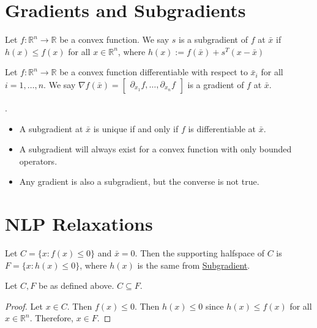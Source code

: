 \documentclass[a4paper]{report}
\begin{document}
	\section{Gradients and Subgradients}
	\begin{definition}[Subgradient]
		\label{subgradient} Let $f : \mathbb{R}^{n} \rightarrow \mathbb{R}$ be a convex
		function. We say $s$ is a subgradient of $f$ at $\bar x$ if $h(x) \leq f(x)$
		for all $x \in \mathbb{R}^{n}$, where $h(x) := f(\bar x) + s^{T} (x - \bar x)$
	\end{definition}
	\begin{definition}[Gradient]
		Let $f : \mathbb{R}^{n} \rightarrow \mathbb{R}$ be a convex function differentiable
		with respect to $\bar x_{i}$ for all $i = 1, \dots, n$. We say
		$\nabla f(\bar x) =
		\begin{bmatrix}
			\partial_{x_1}f, \dots, \partial_{x_n}f
		\end{bmatrix}$ is a gradient of $f$ at $\bar x$.
	\end{definition}

	\begin{proposition}
		\label{prop} . \\
		\begin{itemize}
			\item A subgradient at $\bar x$ is unique if and only if $f$ is differentiable
				at $\bar x$.

			\item A subgradient will always exist for a convex function with only bounded
				operators.

			\item Any gradient is also a subgradient, but the converse is not true.
		\end{itemize}
	\end{proposition}

	\section{NLP Relaxations}
	\begin{definition}
		\label{supporting} Let $C = \{x : f(x) \leq 0\}$ and $\bar x = 0$. Then the
		supporting halfspace of $C$ is $F = \{x: h(x) \leq 0 \}$, where $h(x)$ is the
		same from \hyperref[subgradient]{Subgradient}.
	\end{definition}
	\begin{proposition}
		Let $C, F$ be as defined above. $C \subseteq F$.
	\end{proposition}
	\begin{proof}
		Let $x \in C$. Then $f(x) \leq 0$. Then $h(x) \leq 0$ since $h(x) \leq f(x)$
		for all $x \in \mathbb{R}^{n}$. Therefore, $x \in F$.
	\end{proof}
\end{document}
